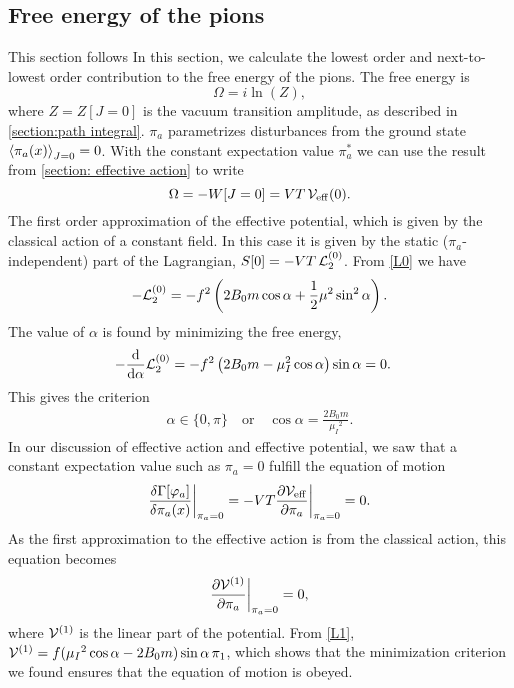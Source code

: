 \subsection{Free energy of the pions}
This section follows \cite{Andersen:two-flavor-chpt,mojahed}
In this section, we calculate the lowest order and next-to-lowest order contribution to the free energy of the pions.
The free energy is
\begin{equation}
    \Omega = i \ln(Z),
\end{equation}
where $Z = Z[J=0]$ is the vacuum transition amplitude, as described in \autoref{section:path integral}.
$\pi_a$ parametrizes disturbances from the ground state $\ex{\pi_a(x)}_{J=0} = 0$.
With the constant expectation value $\pi^*_a$ we can use the result from \autoref{section: effective action} to write
\begin{equation}
    \Omega = -W[J=0] = V T \, \mathcal{V}_{\mathrm{eff}}(0).
\end{equation}
The first order approximation of the effective potential, which is given by the classical action of a constant field.
In this case it is given by the static ($\pi_a$-independent) part of the Lagrangian, $S[0] = -V T \, \mathcal{L}_2^{(0)}$.
From \autoref{L0} we have
\begin{equation}
    - \mathcal{L}_2^{(0)} = 
    -f^2   
    \left(
        2B_0m \cos{\alpha}
        + \frac{1}{2} \mu^2 \sin^2{\alpha}
    \right).
\end{equation}
The value of $\alpha$ is found by minimizing the free energy,
\begin{align*}
    -&\dv{\alpha} \mathcal{L}_2^{(0)} 
    = - f^2\left(2B_0m - \mu_I^2\cos{\alpha}\right)\sin{\alpha}
    = 0.
\end{align*}
This gives the criterion
\begin{align}
    \alpha \in \{0, \pi\} \quad
    \mathrm{or} \quad
    \cos{\alpha} = \frac{2B_0m}{\mu_I{}^2}.
\end{align}
In our discussion of effective action and effective potential, we saw that a constant expectation value such as $\pi_a = 0$ fulfill the equation of motion
\begin{equation}
    \frac{\delta \Gamma[\varphi_a]}{\delta \pi_a(x)} \bigg|_{\pi_a=0}
    = - V T \pdv{\mathcal{V}_{\mathrm{eff}}}{\pi_a}\bigg|_{\pi_a=0} = 0.
\end{equation}
As the first approximation to the effective action is from the classical action, this equation becomes
\begin{equation}
    \pdv{\mathcal{V}^{(1)}}{\pi_a} \bigg|_{\pi_a=0} = 0,
\end{equation}
where $\mathcal{V}^{(1)}$ is the linear part of the potential. 
From \autoref{L1}, $\mathcal{V}^{(1)} = f(\mu_I{}^2\cos{\alpha} - 2B_0m)\sin{\alpha} \, \pi_1 $, which shows that the minimization criterion we found ensures that the equation of motion is obeyed.

